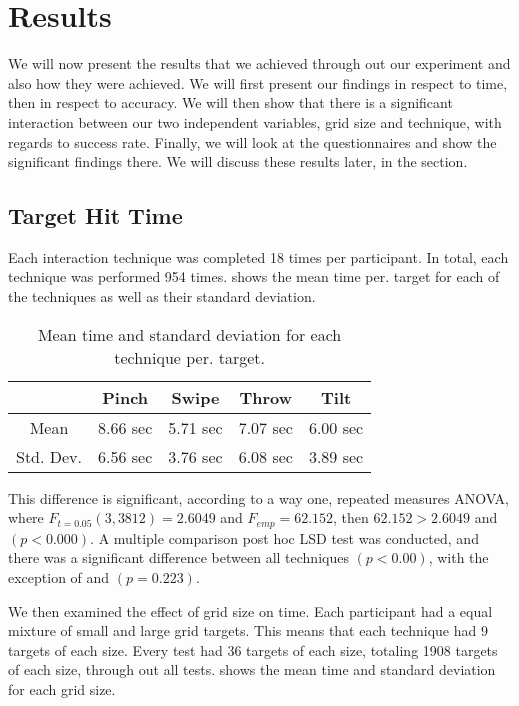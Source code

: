 \section{Results}
We will now present the results that we achieved through out our experiment and also how they were achieved. We will first present our findings in respect to time, then in respect to accuracy. We will then show that there is a significant interaction between our two independent variables, grid size and technique, with regards to success rate. Finally, we will look at the questionnaires and show the significant findings there. We will discuss these results later, in the  section.  

\subsection{Target Hit Time}

Each interaction technique was completed 18 times per participant. In total, each technique was performed 954 times.  shows the mean time per. target for each of the techniques as well as their standard deviation. 
\begin{table}[H]
	\centering
	\begin{tabular}{|c|c|c|c|c|}
		\hline
		\rowcolor[HTML]{9B9B9B} 
		 & \textbf{Pinch} & \textbf{Swipe} & \textbf{Throw} & \textbf{Tilt} \\ \hline
		Mean & 8.66  sec         & 5.71 sec          & 7.07 sec          & 6.00 sec         \\ \hline
		Std. Dev. & 6.56 sec & 3.76 sec & 6.08 sec & 3.89 sec \\ \hline
	\end{tabular}
	\caption{Mean time and standard deviation for each technique per. target.}
	\label{tab:meanTimesTechnique}
\end{table}

This difference is significant, according to a way one, repeated measures ANOVA, where $F_{t=0.05}(3,3812)= 2.6049$ and $F_{emp}=62.152$, then $62.152 > 2.6049$ and $(p<0.000)$. A multiple comparison post hoc LSD test was conducted, and there was a significant difference between all techniques $(p<0.00)$, with the exception of \swipe and \tilt $(p=0.223)$. 

We then examined the effect of grid size on time. Each participant had a equal mixture of small and large grid targets. This means that each technique had 9 targets of each size. Every test had 36 targets of each size, totaling 1908 targets of each size, through out all tests.  shows the mean time and standard deviation for each grid size. 

